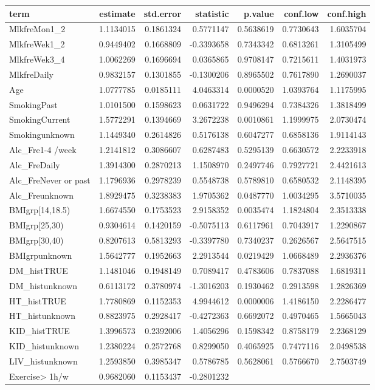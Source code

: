 \documentclass[]{article}
\begin{document}
\begin{longtable}[]{@{}lrrrrrr@{}}
\toprule
term & estimate & std.error & statistic & p.value & conf.low &
conf.high\tabularnewline
\midrule
\endhead
MlkfreMon1\_2 & 1.1134015 & 0.1861324 & 0.5771147 & 0.5638619 &
0.7730643 & 1.6035704\tabularnewline
MlkfreWek1\_2 & 0.9449402 & 0.1668809 & -0.3393658 & 0.7343342 &
0.6813261 & 1.3105499\tabularnewline
MlkfreWek3\_4 & 1.0062269 & 0.1696694 & 0.0365865 & 0.9708147 &
0.7215611 & 1.4031973\tabularnewline
MlkfreDaily & 0.9832157 & 0.1301855 & -0.1300206 & 0.8965502 & 0.7617890
& 1.2690037\tabularnewline
Age & 1.0777785 & 0.0185111 & 4.0463314 & 0.0000520 & 1.0393764 &
1.1175995\tabularnewline
SmokingPast & 1.0101500 & 0.1598623 & 0.0631722 & 0.9496294 & 0.7384326
& 1.3818499\tabularnewline
SmokingCurrent & 1.5772291 & 0.1394669 & 3.2672238 & 0.0010861 &
1.1999975 & 2.0730474\tabularnewline
Smokingunknown & 1.1449340 & 0.2614826 & 0.5176138 & 0.6047277 &
0.6858136 & 1.9114143\tabularnewline
Alc\_Fre1-4 /week & 1.2141812 & 0.3086607 & 0.6287483 & 0.5295139 &
0.6630572 & 2.2233918\tabularnewline
Alc\_FreDaily & 1.3914300 & 0.2870213 & 1.1508970 & 0.2497746 &
0.7927721 & 2.4421613\tabularnewline
Alc\_FreNever or past & 1.1796936 & 0.2978239 & 0.5548738 & 0.5789810 &
0.6580532 & 2.1148395\tabularnewline
Alc\_Freunknown & 1.8929475 & 0.3238383 & 1.9705362 & 0.0487770 &
1.0034295 & 3.5710035\tabularnewline
BMIgrp{[}14,18.5) & 1.6674550 & 0.1753523 & 2.9158352 & 0.0035474 &
1.1824804 & 2.3513338\tabularnewline
BMIgrp{[}25,30) & 0.9304614 & 0.1420159 & -0.5075113 & 0.6117961 &
0.7043917 & 1.2290867\tabularnewline
BMIgrp{[}30,40) & 0.8207613 & 0.5813293 & -0.3397780 & 0.7340237 &
0.2626567 & 2.5647515\tabularnewline
BMIgrpunknown & 1.5642777 & 0.1952663 & 2.2913544 & 0.0219429 &
1.0668489 & 2.2936376\tabularnewline
DM\_histTRUE & 1.1481046 & 0.1948149 & 0.7089417 & 0.4783606 & 0.7837088
& 1.6819311\tabularnewline
DM\_histunknown & 0.6113172 & 0.3780974 & -1.3016203 & 0.1930462 &
0.2913598 & 1.2826369\tabularnewline
HT\_histTRUE & 1.7780869 & 0.1152353 & 4.9944612 & 0.0000006 & 1.4186150
& 2.2286477\tabularnewline
HT\_histunknown & 0.8823975 & 0.2928417 & -0.4272363 & 0.6692072 &
0.4970465 & 1.5665043\tabularnewline
KID\_histTRUE & 1.3996573 & 0.2392006 & 1.4056296 & 0.1598342 &
0.8758179 & 2.2368129\tabularnewline
KID\_histunknown & 1.2380224 & 0.2572768 & 0.8299050 & 0.4065925 &
0.7477116 & 2.0498538\tabularnewline
LIV\_histunknown & 1.2593850 & 0.3985347 & 0.5786785 & 0.5628061 &
0.5766670 & 2.7503749\tabularnewline
Exercise\textgreater{} 1h/w & 0.9682060 & 0.1153437 & -0.2801232 &

\end{longtable}
\end{document}
